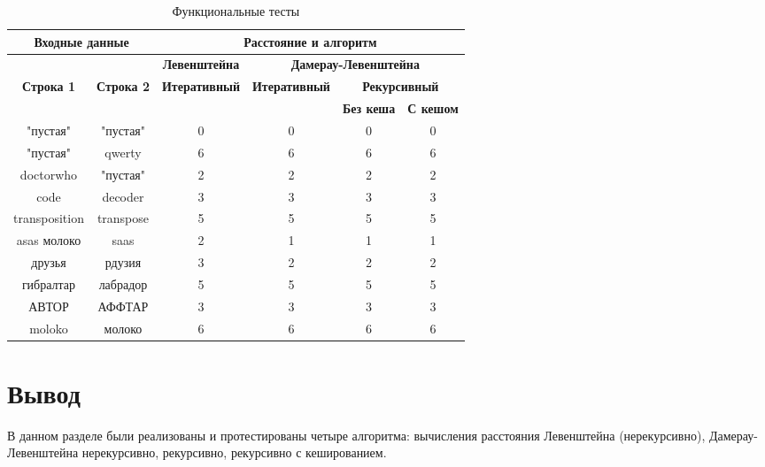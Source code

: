 \begin{table}[ht]
	\small
	\begin{center}
		\begin{threeparttable}
			\caption{Функциональные тесты}
			\label{tbl:func_tests}
			\begin{tabular}{|c|c|c|c|c|c|}
				\hline
				\multicolumn{2}{|c|}{\bfseries Входные данные}
				& \multicolumn{4}{c|}{\bfseries Расстояние и алгоритм} \\ 
				\hline 
				&
				& \multicolumn{1}{c|}{\bfseries Левенштейна} 
				& \multicolumn{3}{c|}{\bfseries Дамерау-Левенштейна} \\ \cline{3-6}
				
				\bfseries Строка 1 & \bfseries Строка 2 & \bfseries Итеративный & \bfseries Итеративный
				
				& \multicolumn{2}{c|}{\bfseries Рекурсивный} \\ \cline{5-6}
				& & & & \bfseries Без кеша & \bfseries С кешом \\
				\hline
				"пустая" & "пустая" & 0 & 0 & 0 & 0 \\
				\hline
				"пустая" & qwerty & 6 & 6 & 6 & 6 \\
				\hline
				doctorwho & "пустая" & 2 & 2 & 2 & 2 \\
				\hline
				code & decoder & 3 & 3 & 3 & 3 \\
				\hline
				transposition & transpose & 5 & 5 & 5 & 5 \\
				\hline
				asas молоко& saas & 2 & 1 & 1 & 1 \\
				\hline
				друзья & рдузия & 3 & 2 & 2 & 2 \\
				\hline
				гибралтар & лабрадор & 5 & 5 & 5 & 5 \\
				\hline
				АВТОР & АФФТАР & 3 & 3 & 3 & 3 \\
				\hline
				moloko & молоко & 6 & 6 & 6 & 6 \\
				\hline
			\end{tabular}	
		\end{threeparttable}
	\end{center}
\end{table}

\section*{Вывод}

В данном разделе были реализованы и протестированы четыре алгоритма:
вычисления расстояния Левенштейна (нерекурсивно), Дамерау-Левенштейна нерекурсивно, рекурсивно, рекурсивно с кешированием.
    